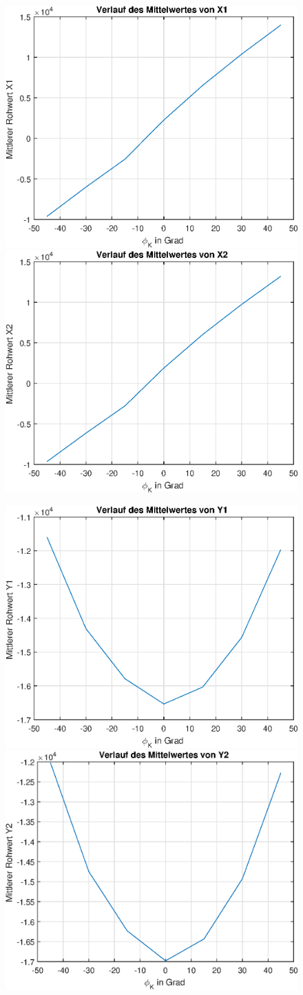 \documentclass{article}
\begin{document}
\begin{figure}[h]
	\includegraphics[width=0.5\linewidth]{img/X1_mean.eps}
	\includegraphics[width=0.5\linewidth]{img/X2_mean.eps}
\end{figure}
\begin{figure}[h]
	\includegraphics[width=0.5\linewidth]{img/Y1_mean.eps}
	\includegraphics[width=0.5\linewidth]{img/Y2_mean.eps}
\end{figure}
\end{document}

